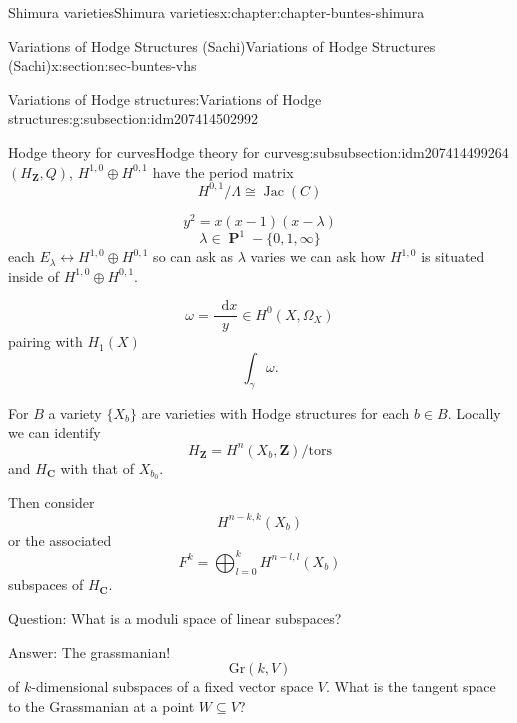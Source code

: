 \documentclass[oneside,10pt,]{book}
\numberwithin{equation}{section}
\newcommand{\diff}{\mathop{}\!\mathrm{d}}
\newcommand{\ZZ}{\mathbf{Z}}
\newcommand{\CC}{\mathbf{C}}
\newcommand{\tors}{\mathrm{tors}}
\DeclareMathOperator{\Jac}{Jac}
\DeclareMathOperator{\PP}{\mathbf{P}}
\begin{document}
\begin{chapterptx}{Shimura varieties}{}{Shimura varieties}{}{}{x:chapter:chapter-buntes-shimura}
\begin{sectionptx}{Variations of Hodge Structures (Sachi)}{}{Variations of Hodge Structures (Sachi)}{}{}{x:section:sec-buntes-vhs}
\begin{subsectionptx}{Variations of Hodge structures:}{}{Variations of Hodge structures:}{}{}{g:subsection:idm207414502992}
%
%
\typeout{************************************************}
\typeout{************************************************}
%
\begin{subsubsectionptx}{Hodge theory for curves}{}{Hodge theory for curves}{}{}{g:subsubsection:idm207414499264}
\((H_\ZZ, Q)\), \(H^{1,0} \oplus H^{0,1}\) have the period matrix%
\begin{equation*}
H^{0,1}/\Lambda \cong \Jac(C)
\end{equation*}
%
\par
%
\begin{equation*}
y^2 = x(x-1)(x-\lambda)
\end{equation*}
%
\begin{equation*}
\lambda \in \PP^1 - \{0,1,\infty\}
\end{equation*}
each \(E_\lambda \leftrightarrow H^{1,0} \oplus H^{0,1}\) so can ask as \(\lambda\) varies we can ask how \(H^{1,0}\) is situated inside of \(H^{1,0} \oplus H^{0,1}\).%
\par
%
\begin{equation*}
\omega = \frac{\diff x}{y} \in H^0(X,\Omega_X)
\end{equation*}
pairing with \(H_1(X)\)%
\begin{equation*}
\int_\gamma \omega\text{.}
\end{equation*}
%
\par
For \(B\) a variety \(\{X_b\}\) are varieties with Hodge structures for each \(b\in B\). Locally we can identify%
\begin{equation*}
H_\ZZ = H^n(X_b , \ZZ)/\tors
\end{equation*}
and \(H_\CC \) with that of \(X_{b_0}\).%
\par
Then consider%
\begin{equation*}
H^{n-k, k}(X_b)
\end{equation*}
or the associated%
\begin{equation*}
F^k = \bigoplus_{l=0}^k H^{n-l,l}(X_b)
\end{equation*}
subspaces of \(H_\CC\).%
\par
Question: What is a moduli space of linear subspaces?%
\par
Answer: The grassmanian!%
\begin{equation*}
{\mathrm{Gr}}(k,V)
\end{equation*}
of \(k\)-dimensional subspaces of a fixed vector space \(V\). What is the tangent space to the Grassmanian at a point \(W\subseteq V\)?%

\end{subsubsectionptx}
\end{subsectionptx}
\end{sectionptx}
\end{chapterptx}
\end{document}
